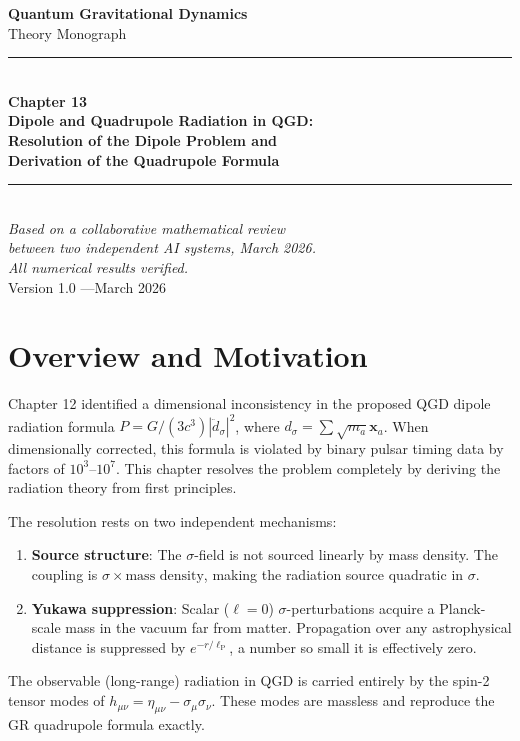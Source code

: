 \documentclass[12pt,a4paper]{article}
\newcommand{\lP}{\ell_{\mathrm{P}}}
\begin{document}
\begin{titlepage}
  \centering
  \vspace*{2.5cm}
  {\LARGE\bfseries Quantum Gravitational Dynamics\\[0.5em]}
  {\large Theory Monograph\\[2.5cm]}
  \rule{\textwidth}{1pt}\\[0.6em]
  {\Huge\bfseries Chapter 13}\\[0.5em]
  {\Large\bfseries Dipole and Quadrupole Radiation in QGD:\\[0.25em]
   Resolution of the Dipole Problem and\\[0.25em]
   Derivation of the Quadrupole Formula}\\[0.6em]
  \rule{\textwidth}{1pt}\\[2cm]
  {\large\itshape Based on a collaborative mathematical review\\[0.3em]
   between two independent AI systems, March 2026.\\[0.5em]
   All numerical results verified.}\\[3cm]
  {\normalsize Version 1.0 \quad---\quad March 2026}
  \vfill
\end{titlepage}

\tableofcontents
\newpage

\section{Overview and Motivation}

Chapter 12 identified a dimensional inconsistency in the proposed QGD dipole
radiation formula $P = G/(3c^3)|\ddot{d}_\sigma|^2$, where
$d_\sigma = \sum\sqrt{m_a}\mathbf{x}_a$. When dimensionally corrected, this
formula is violated by binary pulsar timing data by factors of $10^3$--$10^7$.
This chapter resolves the problem completely by deriving the radiation theory
from first principles.

The resolution rests on two independent mechanisms:
\begin{enumerate}[noitemsep]
  \item \textbf{Source structure}: The $\sigma$-field is not sourced linearly by
    mass density. The coupling is $\sigma\times\text{mass density}$, making the
    radiation source quadratic in $\sigma$.
  \item \textbf{Yukawa suppression}: Scalar ($\ell=0$) $\sigma$-perturbations
    acquire a Planck-scale mass in the vacuum far from matter.
    Propagation over any astrophysical distance is suppressed by
    $e^{-r/\lP}$, a number so small it is effectively zero.
\end{enumerate}
The observable (long-range) radiation in QGD is carried entirely by the
spin-2 tensor modes of $h_{\mu\nu} = \eta_{\mu\nu} - \sigma_\mu\sigma_\nu$.
These modes are massless and reproduce the GR quadrupole formula exactly.
\end{document}
